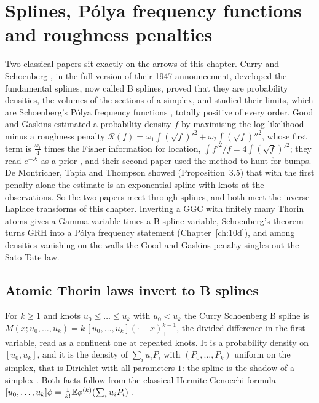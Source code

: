 \section{Splines, P\'olya frequency functions and roughness penalties}\label{sec:lapspline}

Two classical papers sit exactly on the arrows of this chapter. Curry and Schoenberg \cite{curryschoenberg1966}, in the full version of their 1947 announcement, developed the fundamental splines, now called B splines, proved that they are probability densities, the volumes of the sections of a simplex, and studied their limits, which are Schoenberg's P\'olya frequency functions \cite{schoenberg1951}, totally positive of every order. Good and Gaskins \cite{goodgaskins1971} estimated a probability density $f$ by maximising the log likelihood minus a roughness penalty $\mathcal R(f)=\omega_1\int(\sqrt f)'^2+\omega_2\int(\sqrt f)''^2$, whose first term is $\frac{\omega_1}4$ times the Fisher information for location, $\int f'^2/f=4\int(\sqrt f)'^2$; they read $e^{-\mathcal R}$ as a prior \cite{goodgaskins1971,goodgaskins1980}, and their second paper used the method to hunt for bumps. De Montricher, Tapia and Thompson \cite{demontrichertapiathompson1975} showed (Proposition~3.5) that with the first penalty alone the estimate is an exponential spline with knots at the observations. So the two papers meet through splines, and both meet the inverse Laplace transforms of this chapter. Inverting a GGC with finitely many Thorin atoms gives a Gamma variable times a B spline variable, Schoenberg's theorem turns GRH into a P\'olya frequency statement (Chapter~\ref{ch:10d}), and among densities vanishing on the walls the Good and Gaskins penalty singles out the Sato Tate law.

\subsection{Atomic Thorin laws invert to B splines}

For $k\ge1$ and knots $u_0\le\dots\le u_k$ with $u_0<u_k$ the Curry Schoenberg B spline is $M(x;u_0,\dots,u_k)=k\,[u_0,\dots,u_k](\cdot-x)_+^{k-1}$, the divided difference in the first variable, read as a confluent one at repeated knots. It is a probability density on $[u_0,u_k]$, and it is the density of $\sum_iu_iP_i$ with $(P_0,\dots,P_k)$ uniform on the simplex, that is Dirichlet with all parameters $1$: the spline is the shadow of a simplex \cite{curryschoenberg1966}. Both facts follow from the classical Hermite Genocchi formula $[u_0,\dots,u_k]\phi=\frac1{k!}\mathbb{E}\phi^{(k)}(\sum_iu_iP_i)$ \cite{deboor2005}.

